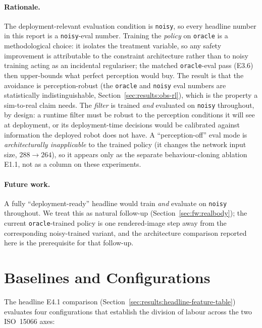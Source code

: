 \documentclass[11pt,a4paper]{report}
\newcommand{\iso}{ISO~15066}
\begin{document}
\paragraph{Rationale.}
The deployment-relevant evaluation condition is \texttt{noisy}, so
every headline number in this report is a \texttt{noisy}-eval number.
Training the \emph{policy} on \texttt{oracle} is a methodological
choice: it isolates the treatment variable, so any safety improvement
is attributable to the constraint architecture rather than to noisy
training acting as an incidental regulariser; the matched
\texttt{oracle}-eval pass (E3.6) then upper-bounds what perfect
perception would buy. The result is that the avoidance is
perception-robust (the \texttt{oracle} and \texttt{noisy} eval numbers
are statistically indistinguishable,
Section~\ref{sec:results:obs-rl}), which is the property a sim-to-real
claim needs. The \emph{filter} is trained \emph{and} evaluated on
\texttt{noisy} throughout, by design: a runtime filter must be robust
to the perception conditions it will see at deployment, or its
deployment-time decisions would be calibrated against information the
deployed robot does not have. A ``perception-off'' eval mode is
\emph{architecturally inapplicable} to the trained policy (it changes
the network input size, $288 \to 264$), so it appears only as the
separate behaviour-cloning ablation E1.1, not as a column on these
experiments.

\paragraph{Future work.}
A fully ``deployment-ready'' headline would train \emph{and}
evaluate on \texttt{noisy} throughout. We treat this as natural
follow-up (Section~\ref{sec:fw:realbody}); the current
\texttt{oracle}-trained policy is one rendered-image step away from
the corresponding noisy-trained variant, and the architecture
comparison reported here is the prerequisite for that follow-up.

\section{Baselines and Configurations}
\label{sec:setup:baselines}

The headline E4.1 comparison
(Section~\ref{sec:results:headline-feature-table}) evaluates four
configurations that establish the division of labour across the two
\iso{} axes:
\end{document}
